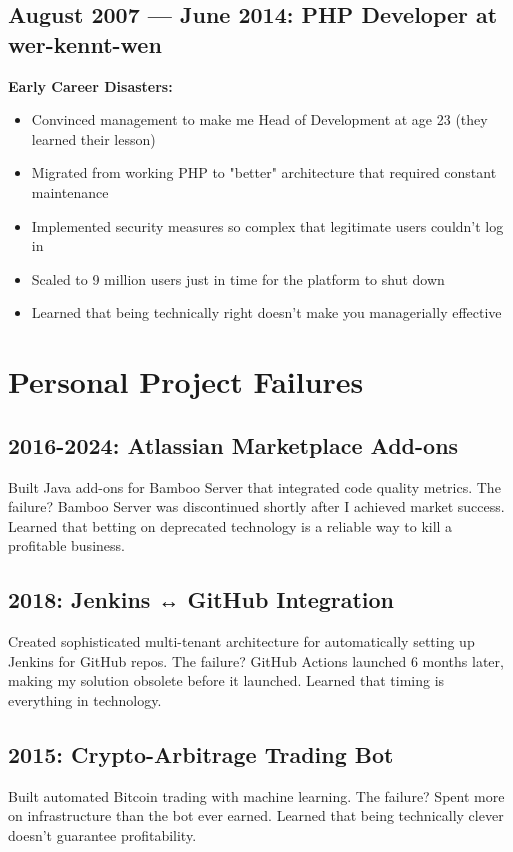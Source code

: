 \documentclass[10pt,a4paper]{article}
\begin{document}
\subsection*{August 2007 — June 2014: PHP Developer at wer-kennt-wen}
\textbf{Early Career Disasters:}
\begin{itemize}[leftmargin=1em,topsep=0pt,itemsep=0pt]
\item Convinced management to make me Head of Development at age 23 (they learned their lesson)
\item Migrated from working PHP to "better" architecture that required constant maintenance
\item Implemented security measures so complex that legitimate users couldn't log in
\item Scaled to 9 million users just in time for the platform to shut down
\item Learned that being technically right doesn't make you managerially effective
\end{itemize}

\section*{Personal Project Failures}

\subsection*{2016-2024: Atlassian Marketplace Add-ons}
Built Java add-ons for Bamboo Server that integrated code quality metrics. The failure? Bamboo Server was discontinued shortly after I achieved market success. Learned that betting on deprecated technology is a reliable way to kill a profitable business.

\subsection*{2018: Jenkins ↔ GitHub Integration}
Created sophisticated multi-tenant architecture for automatically setting up Jenkins for GitHub repos. The failure? GitHub Actions launched 6 months later, making my solution obsolete before it launched. Learned that timing is everything in technology.

\subsection*{2015: Crypto-Arbitrage Trading Bot}
Built automated Bitcoin trading with machine learning. The failure? Spent more on infrastructure than the bot ever earned. Learned that being technically clever doesn't guarantee profitability.
\end{document}
